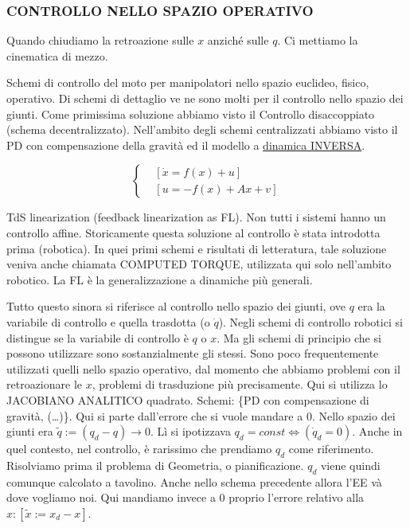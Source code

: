 \subsubsection{CONTROLLO NELLO SPAZIO OPERATIVO}

Quando chiudiamo la retroazione sulle $x$ anziché sulle $q$. Ci mettiamo la cinematica di mezzo.

Schemi di controllo del moto per manipolatori nello spazio euclideo, fisico, operativo. Di schemi di dettaglio ve ne sono molti per il controllo nello spazio dei giunti. Come primissima soluzione abbiamo visto il Controllo disaccoppiato (schema decentralizzato). Nell'ambito degli schemi centralizzati abbiamo visto il PD con compensazione della gravità ed il modello a \underline{dinamica INVERSA}.

\[
	\left\{
	\begin{aligned}
	&[\dot{x}=f(x)+u]\\
	&[u = -f(x) + Ax + v]
	\end{aligned}
	\right.
\]

TdS linearization (feedback linearization as FL). Non tutti i sistemi hanno un controllo affine. Storicamente questa soluzione al controllo è stata introdotta prima (robotica). In quei primi schemi e risultati di letteratura, tale soluzione veniva anche chiamata COMPUTED TORQUE, utilizzata qui solo nell'ambito robotico. La FL è la generalizzazione a dinamiche più generali.

Tutto questo sinora si riferisce al controllo nello spazio dei giunti, ove $q$ era la variabile di controllo e quella trasdotta (o $\dot{q}$). Negli schemi di controllo robotici si distingue se la variabile di controllo è $q$ o $x$. Ma gli schemi di principio che si possono utilizzare sono sostanzialmente gli stessi. Sono poco frequentemente utilizzati quelli nello spazio operativo, dal momento che abbiamo problemi con il retroazionare le $x$, problemi di trasduzione più precisamente. Qui si utilizza lo JACOBIANO ANALITICO quadrato. Schemi: \{PD con compensazione di gravità, (\dots)\}. Qui si parte dall'errore che si vuole mandare a 0. Nello spazio dei giunti era $\tilde{q}:=(q_d-q)\to 0$. Lì si ipotizzava $q_d=const\iff (\dot{q}_d=0)$. Anche in quel contesto, nel controllo, è rarissimo che prendiamo $q_d$ come riferimento. Risolviamo prima il problema di Geometria, o pianificazione. $q_d$ viene quindi comunque calcolato a tavolino. Anche nello schema precedente allora l'EE và dove vogliamo noi. Qui mandiamo invece a 0 proprio l'errore relativo alla $x: [\tilde{x} := x_d-x]$.

